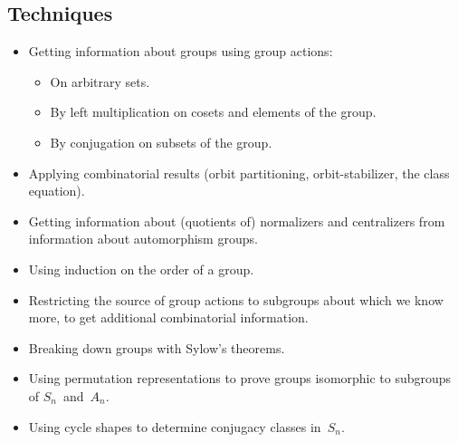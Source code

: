 \subsection*{Techniques}
\begin{itemize}[itemsep=0pt]
\item Getting information about groups using group actions:
\begin{itemize}[itemsep=0pt]
\item On arbitrary sets.
\item By left multiplication on cosets and elements of the group.
\item By conjugation on subsets of the group.
\end{itemize}
\item Applying combinatorial results (orbit partitioning, orbit-stabilizer, the class equation).
\item Getting information about (quotients of) normalizers and centralizers from information about automorphism groups.
\item Using induction on the order of a group.
\item Restricting the source of group actions to subgroups about which we know more, to get additional combinatorial information.
\item Breaking down groups with Sylow's theorems.
\item Using permutation representations to prove groups isomorphic to subgroups of \(S_n\)~and~\(A_n\).
\item Using cycle shapes to determine conjugacy classes in~\(S_n\).
\end{itemize}

